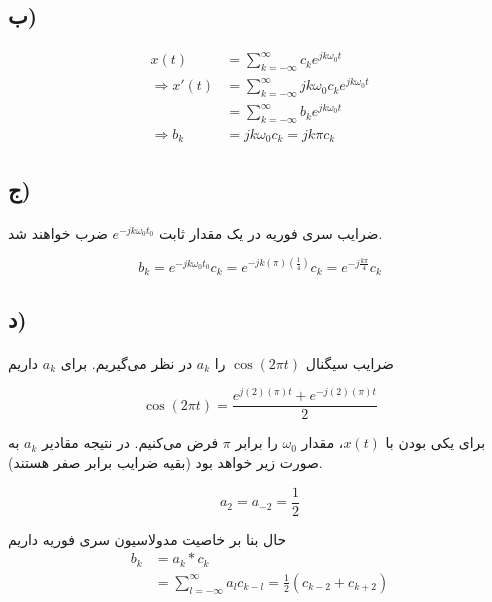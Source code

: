 \documentclass{article}
\begin{document}
	\subsection*{ب)}
	\begin{align*}
		x(t) &= \sum_{k=-\infty}^{\infty} c_k e^{jk\omega_0t} \\
		\Rightarrow
		x'(t) &= \sum_{k=-\infty}^{\infty} jk\omega_0 c_k e^{jk\omega_0t} \\
		&= \sum_{k=-\infty}^{\infty} b_k e^{jk\omega_0t} \\
		\Rightarrow
		b_k &= jk\omega_0 c_k = jk\pi c_k
	\end{align*}

	\subsection*{ج)}
	\paragraph*{}
	ضرایب سری فوریه در یک مقدار ثابت
	$e^{-jk\omega_0 t_0}$
	ضرب خواهند شد.

	\begin{equation*}
		b_k = e^{-jk\omega_0 t_0} c_k = e^{-jk (\pi) (\frac{1}{4})} c_k
		= e^{-j\frac{k\pi}{4}} c_k
	\end{equation*}

	\subsection*{د)}
	\paragraph*{}
	ضرایب سیگنال
	$\cos(2\pi t)$
	را
	$a_k$
	در نظر می‌گیریم. برای
	$a_k$
	داریم

	\begin{equation*}
		\cos(2\pi t) = \frac{e^{j(2)(\pi)t} + e^{-j(2)(\pi)t}}{2}
	\end{equation*}

	برای یکی بودن با
	$x(t)$،
	مقدار
	$\omega_0$
	را برابر
	$\pi$
	فرض می‌کنیم. در نتیجه مقادیر
	$a_k$
	به صورت زیر خواهد بود (بقیه ضرایب برابر صفر هستند).

	\begin{equation*}
		a_2 = a_{-2} = \frac{1}{2}
	\end{equation*}

	حال بنا بر خاصیت مدولاسیون سری فوریه داریم
	\begin{align*}
		b_k &= a_k * c_k \\
		&= \sum_{l=-\infty}^{\infty} a_l c_{k-l}
		= \frac{1}{2} (c_{k-2} + c_{k+2}) \\
	\end{align*}
\end{document}
